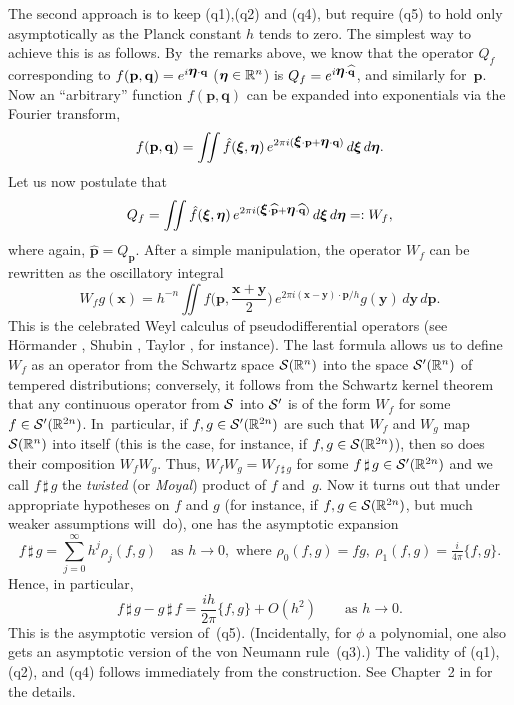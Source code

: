 \documentclass[12pt]{amsart}
\numberwithin{equation}{section}
\theoremstyle{remark}
\newcommand\RR{\mathbb R}
\newcommand{\bfeta}{\mbox{\boldmath $\eta$}}
\newcommand{\bxi}{\mbox{\boldmath $\xi$}}
\newcommand{\bp}{\mathbf p}
\newcommand{\bq}{\mathbf q}
\newcommand{\bx}{\mathbf x}
\newcommand{\by}{\mathbf y}
\begin{document}
The second approach is to keep (q1),(q2) and (q4), but require (q5) to hold
only asymptotically as the Planck constant $h$ tends to zero. The simplest way
to achieve this is as follows. By~the remarks above, we know that the operator
$Q_f$ corresponding to $f(\bp,\bq)=e^{i\bfeta\cdot \bq}$ ($\bfeta\in\RR^n$) is
$Q_f=e^{i\bfeta\cdot\widehat{\bq}}$, and similarly for~$\bp$.  Now an
``arbitrary'' function $f(\bp,\bq)$ can be expanded into exponentials via the
Fourier transform,
$$ f(\bp,\bq) = \iint \hat f(\bxi,\bfeta) \,
e^{2\pi i (\bxi\cdot \bp + \bfeta \cdot\bq)} \, d\bxi \, d\bfeta .  $$
Let us now postulate that
$$ Q_f = \iint \hat f(\bxi,\bfeta) \,
e^{2\pi i(\bxi\cdot\widehat{\bp} + \bfeta \cdot\widehat{\bq})} \, d\bxi \,
d\bfeta =: W_f,  $$
where again, $\widehat{\bp} = Q_\bp$.
After a simple manipulation, the operator $W_f$ can be rewritten as the
oscillatory integral
\begin{equation}  W_f g(\bx) = h^{-n} \iint f \Big(  \bp ,\frac{\bx+\by}2 \Big)
\, e^{2\pi i(\bx-\by)\cdot \bp /h}  g(\by) \, d\by \, d \bp  .
\label{tag:WEY}  \end{equation}
This is the celebrated Weyl calculus of pseudodifferential operators (see
H\"ormander \cite{bib:HormW}, Shubin \cite{bib:Shu}, Taylor \cite{bib:Tayl},
for instance). The last formula allows us to define $W_f$ as an operator from
the Schwartz space $\Cal S(\RR^n)$ into the space $\Cal S'(\RR^n)$ of tempered
distributions; conversely, it follows from the Schwartz kernel theorem that any
continuous operator from $\mathcal S$ into $\mathcal S'$ is of the form $W_f$ for some
$f\in\Cal S'(\RR^{2n})$. In~particular, if $f,g\in \Cal S'(\RR^{2n})$ are such
that $W_f$ and $W_g$ map $\Cal S(\RR^n)$ into itself (this is the case, for
instance, if $f,g\in\Cal S(\RR^{2n})$), then so does their composition
$W_f W_g$.  Thus, $W_f W_g=W_{f\,\sharp\, g}$ for some $f\,\sharp\, g\in\Cal
S'(\RR^{2n})$ and we  call $f\,\sharp\, g$ the {\it twisted\/} (or {\sl
Moyal\/}) product of $f$ and~$g$. Now it turns out that under appropriate
hypotheses on $f$ and $g$ (for instance, if $f,g\in\Cal S(\RR^{2n})$, but much
weaker assumptions will~do), one has the asymptotic expansion
\begin{equation}  f\,\sharp\, g = \sum_{j=0}^\infty h^j \rho_j(f,g)
\quad\text{as }h\to0,
\text{ where }\rho_0(f,g)=fg,\ \rho_1(f,g)= \tfrac i{4\pi}\{f,g\}.
\label{tag:MOY} \end{equation}
Hence, in particular,
\begin{equation}  f\,\sharp\, g - g\,\sharp\, f = \frac{ih}{2\pi} \{f,g\} +
O(h^2) \qquad\text{as }h\to0.  \label{tag:AS}  \end{equation}
This is the asymptotic version of~(q5). (Incidentally, for $\phi$ a polynomial,
one also gets an asymptotic version of the von Neumann rule~(q3).) The validity
of (q1), (q2), and (q4) follows immediately from the construction. See
Chapter~2 in \cite{bib:Foll} for the details.
\end{document}
